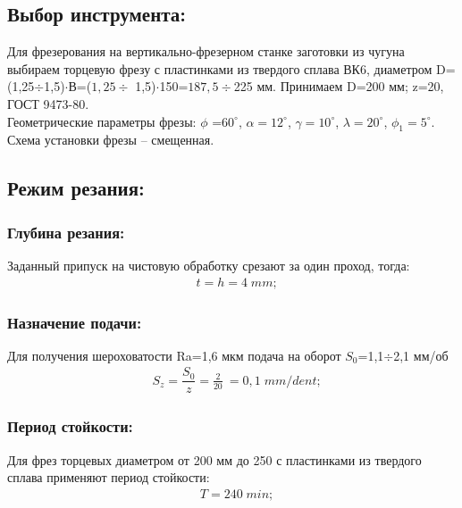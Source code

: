 \newpage

\subsection{Выбор инструмента:}
Для фрезерования на вертикально-фрезерном станке заготовки из чугуна выбираем торцевую фрезу с пластинками из твердого сплава ВК6, диаметром D=(1,25$\div$1,5)$\cdot$В=($1,25\div$ 1,5)$\cdot$150=$187,5\div$225 мм. Принимаем D=200 мм; z=20, ГОСТ 9473-80.\\
   Геометрические параметры фрезы: $\phi$ =$60^{\circ}$, $\alpha=12^{\circ}$, $\gamma=10^{\circ}$, $\lambda=20^{\circ}$, $\phi_1=5^{\circ}$.\\
Схема установки фрезы – смещенная.

\subsection{Режим резания:}
\subsubsection{Глубина резания:}
Заданный припуск на чистовую обработку срезают за один проход, тогда:\\
\begin{equation}
	\begin{split}
		&t=h=4\;mm;
	\end{split}
\end{equation}

\subsubsection{Назначение подачи:}
Для получения шероховатости Ra=1,6 мкм подача на оборот $S_0$=1,1$\div$2,1 мм/об\\
\begin{equation}
	\begin{split}
		&S_z=\dfrac{S_0}{z} = \frac{2}{20}\ = 0,1\;mm/dent;
	\end{split}
\end{equation}

\subsubsection{Период стойкости:}
Для фрез торцевых диаметром от 200 мм до 250 с пластинками из твердого сплава применяют период стойкости:\\
\begin{equation}
	\begin{split}
		&T=240\;min;
	\end{split}
\end{equation}

